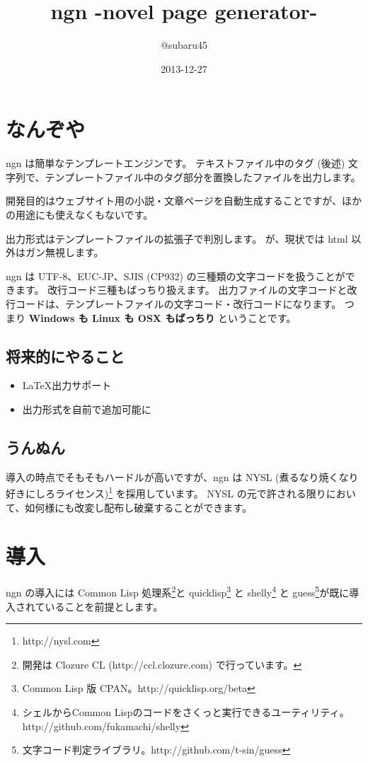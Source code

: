 \documentclass[a4j]{jsarticle}
\begin{document}
\title{ngn -novel page generator-}
\author{@subaru45}
\date{2013-12-27}
\maketitle


\section{なんぞや}
ngn は簡単なテンプレートエンジンです。
テキストファイル中のタグ (後述) 文字列で、テンプレートファイル中のタグ部分を置換したファイルを出力します。

開発目的はウェブサイト用の小説・文章ページを自動生成することですが、ほかの用途にも使えなくもないです。

出力形式はテンプレートファイルの拡張子で判別します。
が、現状では html 以外はガン無視します。

ngn は UTF-8、EUC-JP、SJIS (CP932) の三種類の文字コードを扱うことができます。
改行コード三種もばっちり扱えます。
出力ファイルの文字コードと改行コードは、テンプレートファイルの文字コード・改行コードになります。
つまり \textbf{Windows も Linux も OSX もばっちり} ということです。


\subsection{将来的にやること}

\begin{itemize}
  \item \LaTeX 出力サポート
  \item 出力形式を自前で追加可能に
\end{itemize}

\subsection{うんぬん}
導入の時点でそもそもハードルが高いですが、ngn は NYSL (煮るなり焼くなり好きにしろライセンス)\footnote{http://nysl.com} を採用しています。
NYSL の元で許される限りにおいて、如何様にも改変し配布し破棄することができます。



\section{導入}
ngn の導入には Common Lisp 処理系\footnote{開発は Clozure CL (http://ccl.clozure.com) で行っています。}と quicklisp\footnote{Common Lisp 版 CPAN。http://quicklisp.org/beta} と shelly\footnote{シェルからCommon Lispのコードをさくっと実行できるユーティリティ。http://github.com/fukamachi/shelly} と guess\footnote{文字コード判定ライブラリ。http://github.com/t-sin/guess}が既に導入されていることを前提とします。
\end{document}

